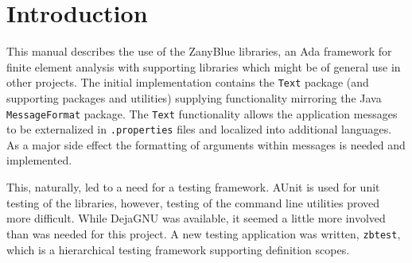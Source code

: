 %
%
%
%
%
%
%
%

\chapter{Introduction}

This manual describes the use of the ZanyBlue libraries, an Ada framework for
finite element analysis with supporting libraries which might be of general
use in other projects.  The initial implementation contains the \texttt{Text}
package (and supporting packages and utilities) supplying functionality
mirroring the Java \texttt{MessageFormat} package.  The \texttt{Text}
functionality allows the application messages to be externalized in
\texttt{.properties} files and localized into additional languages.  As a
major side effect the formatting of arguments within messages is needed and
implemented.

This, naturally, led to a need for a testing framework.  AUnit is used for
unit testing of the libraries, however, testing of the command line utilities
proved more difficult.  While DejaGNU was available, it seemed a little more
involved than was needed for this project.  A new testing application was
written, \texttt{zbtest}, which is a hierarchical testing framework supporting
definition scopes.

